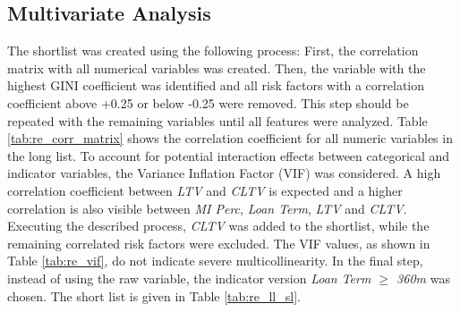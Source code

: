 \subsection{Multivariate Analysis}

The shortlist was created using the following process: First, the correlation matrix with all numerical variables was created. Then, the variable with the highest GINI coefficient was identified and all risk factors with a correlation coefficient above +0.25 or below -0.25 were removed. This step should be repeated with the remaining variables until all features were analyzed. 
Table \ref{tab:re_corr_matrix} shows the correlation coefficient for all numeric variables in the long list. To account for potential interaction effects between categorical and indicator variables, the Variance Inflation Factor (VIF) was considered. A high correlation coefficient between \emph{LTV} and \emph{CLTV} is expected and a higher correlation is also visible between \emph{MI Perc}, \emph{Loan Term}, \emph{LTV} and \emph{CLTV}. Executing the described process, \emph{CLTV} was added to the shortlist, while the remaining correlated risk factors were excluded.  The VIF values, as shown in Table \ref{tab:re_vif}, do not indicate severe multicollinearity. In the final step, instead of using the raw variable, the indicator version \emph{Loan Term $\geq$ 360m} was chosen. The short list is given in Table \ref{tab:re_ll_sl}.

